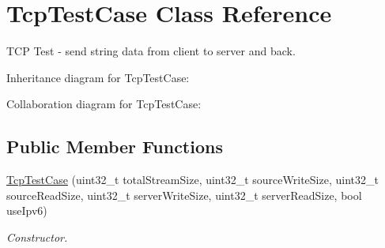 \hypertarget{classTcpTestCase}{}\section{Tcp\+Test\+Case Class Reference}
\label{classTcpTestCase}


T\+CP Test -\/ send string data from client to server and back.  




Inheritance diagram for Tcp\+Test\+Case\+:


Collaboration diagram for Tcp\+Test\+Case\+:
\subsection*{Public Member Functions}
\begin{DoxyCompactItemize}
\item 
\hyperlink{classTcpTestCase_a94342b4f0501986c199c6067655ef155}{Tcp\+Test\+Case} (uint32\+\_\+t total\+Stream\+Size, uint32\+\_\+t source\+Write\+Size, uint32\+\_\+t source\+Read\+Size, uint32\+\_\+t server\+Write\+Size, uint32\+\_\+t server\+Read\+Size, bool use\+Ipv6)
\begin{DoxyCompactList}\small\item\em Constructor. \end{DoxyCompactList}\end{DoxyCompactItemize}

